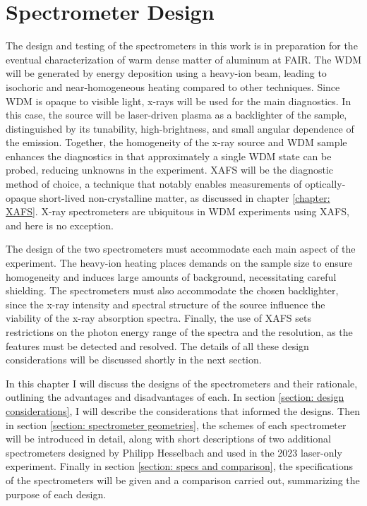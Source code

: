 \chapter{Spectrometer Design}
\label{chapter: spectrometer design}
The design and testing of the spectrometers in this work is in preparation for the eventual characterization of warm dense matter of aluminum at FAIR. The WDM will be generated by energy deposition using a heavy-ion beam, leading to isochoric and near-homogeneous heating compared to other techniques. Since WDM is opaque to visible 
light, x-rays will be used for the main diagnostics. In this case, the 
source will be laser-driven plasma as a backlighter of the sample, 
distinguished by its tunability, high-brightness, and small angular 
dependence of the emission. Together, the homogeneity of the x-ray source and WDM sample enhances the diagnostics in that approximately a single WDM 
state can be probed, reducing unknowns in the experiment. XAFS will be 
the diagnostic method of choice, a technique that notably enables 
measurements of optically-opaque short-lived non-crystalline matter, as discussed in chapter \ref{chapter: XAFS}. X-ray spectrometers are 
ubiquitous in WDM experiments using XAFS, and here is no exception. 

The design of the two spectrometers must accommodate each main 
aspect of the experiment. The heavy-ion heating places demands on the 
sample size to ensure homogeneity and induces large amounts of 
background, necessitating careful shielding. The spectrometers must also accommodate the chosen backlighter, since the x-ray intensity and spectral structure of the source influence the viability of the x-ray absorption spectra. Finally, the use of XAFS sets restrictions on the photon 
energy range of the spectra and the resolution, as the features must be 
detected and resolved. The details of all these design considerations 
will be discussed shortly in the next section.

In this chapter I will discuss the designs of 
the spectrometers and their rationale, outlining the advantages and 
disadvantages of each. In section \ref{section: design considerations}, I 
will describe the considerations that informed the 
designs. Then in section \ref{section: spectrometer geometries}, the schemes of each 
spectrometer will be introduced in detail, along with short descriptions of two additional spectrometers designed by Philipp Hesselbach and used in the 2023 laser-only experiment. Finally in section \ref{section: specs and comparison}, the specifications 
of the spectrometers will be given and a comparison carried out, 
summarizing the purpose of each design.

